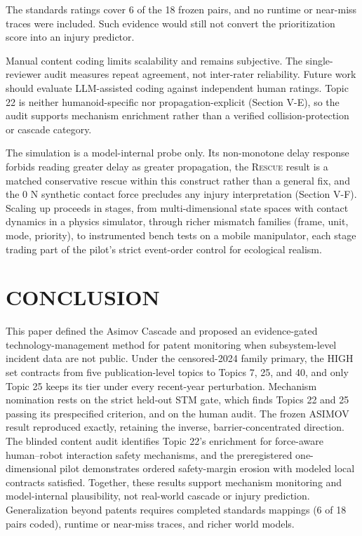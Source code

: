 \documentclass[letterpaper,9pt,conference]{ieeeconf}
\begin{document}
The standards ratings cover 6 of the 18 frozen pairs, and no runtime or near-miss traces were included. Such evidence would still not convert the prioritization score into an injury predictor.

Manual content coding limits scalability and remains subjective. The single-reviewer audit measures repeat agreement, not inter-rater reliability. Future work should evaluate LLM-assisted coding against independent human ratings. Topic 22 is neither humanoid-specific nor propagation-explicit (Section V-E), so the audit supports mechanism enrichment rather than a verified collision-protection or cascade category.

The simulation is a model-internal probe only. Its non-monotone delay response forbids reading greater delay as greater propagation, the \textsc{Rescue} result is a matched conservative rescue within this construct rather than a general fix, and the 0 N synthetic contact force precludes any injury interpretation (Section V-F). Scaling up proceeds in stages, from multi-dimensional state spaces with contact dynamics in a physics simulator, through richer mismatch families (frame, unit, mode, priority), to instrumented bench tests on a mobile manipulator, each stage trading part of the pilot's strict event-order control for ecological realism.

\section{CONCLUSION}

This paper defined the Asimov Cascade and proposed an evidence-gated technology-management method for patent monitoring when subsystem-level incident data are not public. Under the censored-2024 family primary, the HIGH set contracts from five publication-level topics to Topics 7, 25, and 40, and only Topic 25 keeps its tier under every recent-year perturbation. Mechanism nomination rests on the strict held-out STM gate, which finds Topics 22 and 25 passing its prespecified criterion, and on the human audit. The frozen ASIMOV result reproduced exactly, retaining the inverse, barrier-concentrated direction. The blinded content audit identifies Topic 22's enrichment for force-aware human--robot interaction safety mechanisms, and the preregistered one-dimensional pilot demonstrates ordered safety-margin erosion with modeled local contracts satisfied. Together, these results support mechanism monitoring and model-internal plausibility, not real-world cascade or injury prediction. Generalization beyond patents requires completed standards mappings (6 of 18 pairs coded), runtime or near-miss traces, and richer world models.
\end{document}
